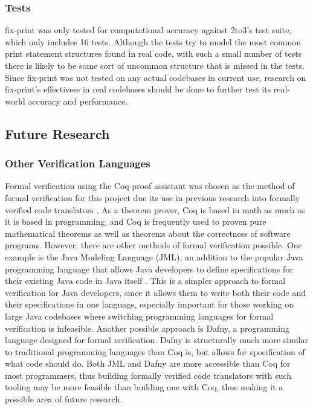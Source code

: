 \subsubsection{Tests}
fix-print was only tested for computational accuracy against 2to3's test suite, which only includes 16 tests. Although the tests try to model the most common print statement structures found in real code, with such a small number of tests there is likely to be some sort of uncommon structure that is missed in the tests. Since fix-print was not tested on any actual codebases in current use, research on fix-print's effectivess in real codebases should be done to further test its real-world accuracy and performance.

\subsection{Future Research}
\subsubsection{Other Verification Languages}
Formal verification using the Coq proof assistant was chosen as the method of formal verification for this project due its use in previous research into formally verified code translators \autocite{Leroy}\autocite{Zhao}. As a theorem prover, Coq is based in math as much as it is based in programming, and Coq is frequently used to proven pure mathematical theorems as well as theorems about the correctness of software programs. However, there are other methods of formal verification possible. One example is the Java Modeling Language (JML), an addition to the popular Java programming language that allows Java developers to define specifications for their existing Java code in Java itself \autocite{Burdy}. This is a simpler approach to formal verification for Java developers, since it allows them to write both their code and their specifications in one language, especially important for those working on large Java codebases where switching programming languages for formal verification is infeasible. Another possible approach is Dafny, a programming language designed for formal verification. Dafny is structurally much more similar to traditional programming languages than Coq is, but allows for specification of what code should do. Both JML and Dafny are more accessible than Coq for most programmers, thus building formally verified code translators with such tooling may be more feasible than building one with Coq, thus making it a possible area of future research.

